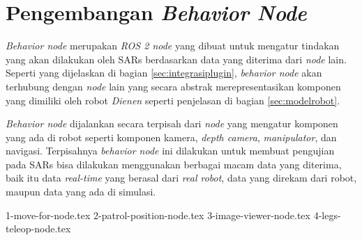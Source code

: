 \section{Pengembangan \emph{Behavior Node}}
\label{sec:behaviornode}

\emph{Behavior node} merupakan \emph{ROS 2 node} yang dibuat untuk mengatur tindakan yang akan dilakukan oleh SARs berdasarkan data yang diterima dari \emph{node} lain.
Seperti yang dijelaskan di bagian \ref{sec:integrasiplugin},
  \emph{behavior node} akan terhubung dengan \emph{node} lain yang secara abstrak merepresentasikan komponen yang dimiliki oleh robot \emph{Dienen} seperti penjelasan di bagian \ref{sec:modelrobot}.

\emph{Behavior node} dijalankan secara terpisah dari \emph{node} yang mengatur komponen yang ada di robot seperti komponen kamera, \emph{depth camera}, \emph{manipulator}, dan navigasi.
Terpisahnya \emph{behavior node} ini dilakukan untuk membuat pengujian pada SARs bisa dilakukan menggunakan berbagai macam data yang diterima,
  baik itu data \emph{real-time} yang berasal dari \emph{real robot},
  data yang direkam dari robot,
  maupun data yang ada di simulasi.

{1-move-for-node.tex}
{2-patrol-position-node.tex}
{3-image-viewer-node.tex}
{4-legs-teleop-node.tex}
